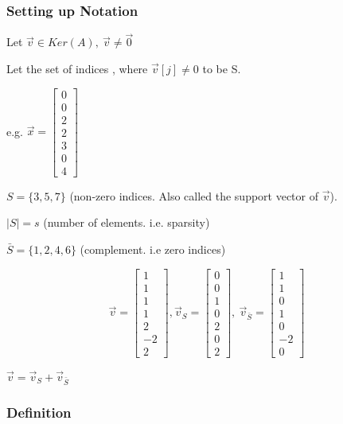 \documentclass[11pt]{article}
\begin{document}
\subsubsection{Setting up Notation}
\label{sec:org0e0c310}
Let \(\vec v \in Ker(A), \ \vec v \neq \vec 0\)

Let the set of indices , where \(\vec v [j] \neq 0\) to be S.

e.g. \(\vec x = \begin{bmatrix} 0\\ 0\\ 2\\ 2\\ 3\\ 0\\ 4 \end{bmatrix}\)

\(S = \{3, 5, 7\}\) (non-zero indices. Also called the support vector of \(\vec v\)).

\(|S| = s\) (number of elements. i.e. sparsity)

\(\bar S = \{1, 2, 4, 6\}\) (complement. i.e zero indices)


$$
\vec v = \begin{bmatrix}1\\ 1\\ 1\\ 1\\ 2\\ -2\\ 2\end{bmatrix}, \vec v_S
= \begin{bmatrix} 0\\ 0\\ 1\\ 0\\ 2\\ 0\\ 2 \end{bmatrix}, \ \vec v_{\bar S}
= \begin{bmatrix} 1\\ 1\\ 0\\ 1\\ 0\\ -2\\ 0 \end{bmatrix}
$$

\(\vec v = \vec v_S + \vec v_{\bar S}\)

\subsubsection{Definition}
\label{sec:org1df2c70}
\end{document}
